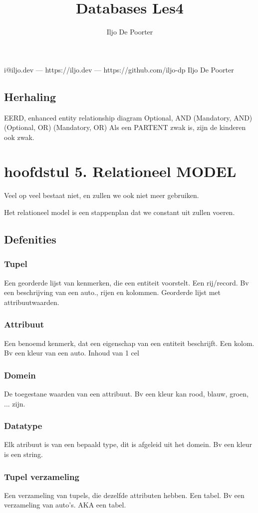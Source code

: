 \documentclass{article}
\makeatletter
\renewcommand{\maketitle}{
\begin{center}
{\huge\bfseries
\theauthor}

\vspace{.25em}
i@iljo.dev --- https://iljo.dev --- https://github.com/iljo-dp
Iljo De Poorter
\end{center}
}
\makeatother
\begin{document}
\title{Databases Les4}
\author{Iljo De Poorter}

\maketitle

\subsection{Herhaling}
EERD, enhanced entity relationship diagram
 {Optional, AND} (Mandatory, AND) (Optional, OR) (Mandatory, OR)
 Als een PARTENT zwak is, zijn de kinderen ook zwak.
 \section{hoofdstul 5. Relationeel MODEL }
 Veel op veel bestaat niet, en zullen we ook niet meer gebruiken.

 Het relationeel model is een stappenplan dat we constant uit zullen voeren. 

 \subsection{Defenities}
 \subsubsection{Tupel}
 Een georderde lijst van kenmerken, die een entiteit voorstelt. Een rij/record. Bv een beschrijving van een auto., rijen en kolommen. Georderde lijst met attribuutwaarden.
 \subsubsection{Attribuut}
 Een benoemd kenmerk, dat een eigenschap van een entiteit beschrijft. Een kolom. Bv een kleur van een auto. Inhoud van 1 cel
 \subsubsection{Domein}
 De toegestane waarden van een attribuut. Bv een kleur kan rood, blauw, groen, ... zijn.
 \subsubsection{Datatype}
 Elk atribuut is van een bepaald type, dit is afgeleid uit het domein. Bv een kleur is een string.
 \subsubsection{Tupel verzameling}
 Een verzameling van tupels, die dezelfde attributen hebben. Een tabel. Bv een verzameling van auto's. AKA een tabel.
\end{document}

